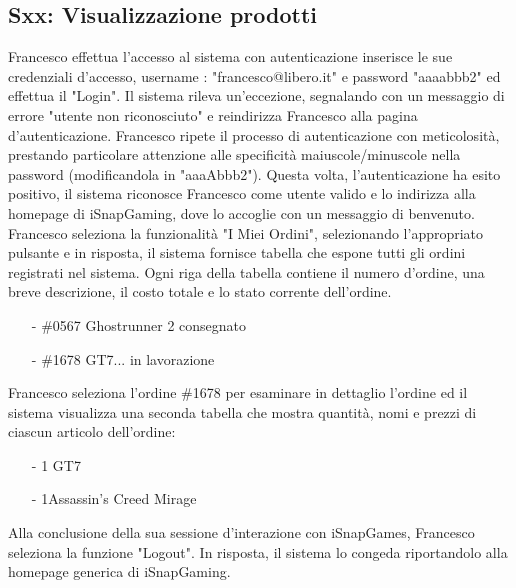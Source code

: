 \documentclass[12pt, a4paper, oneside]{book}
\begin{document}
    \subsection*{Sxx: Visualizzazione prodotti}
        Francesco effettua l'accesso al sistema con autenticazione inserisce  le sue credenziali d'accesso, username :
         "francesco@libero.it" e password "aaaabbb2" ed effettua il "Login". Il sistema rileva un'eccezione, segnalando con un
        messaggio di errore "utente non riconosciuto" e reindirizza Francesco alla pagina d'autenticazione. Francesco ripete
        il processo di autenticazione con meticolosità, prestando particolare attenzione alle specificità maiuscole/minuscole
        nella password (modificandola in "aaaAbbb2"). Questa volta, l'autenticazione ha esito positivo, il sistema riconosce
        Francesco come utente valido e lo indirizza alla homepage di iSnapGaming, dove lo accoglie con un messaggio di benvenuto.
        Francesco seleziona la funzionalità "I Miei Ordini", selezionando l'appropriato pulsante e in risposta, il sistema
        fornisce tabella che espone tutti gli ordini registrati nel sistema. Ogni riga della tabella contiene il numero
        d'ordine, una breve descrizione, il costo totale e lo stato corrente dell'ordine.
        \begin{itemize}
            \item [-] \#0567 Ghostrunner 2 		consegnato
            \item [-] \#1678 GT7... 	in lavorazione
        \end{itemize}
        Francesco seleziona l'ordine \#1678 per esaminare in dettaglio l'ordine ed il  sistema visualizza una seconda tabella
        che mostra quantità, nomi e prezzi di ciascun articolo dell'ordine:
        \begin{itemize}
            \setlength\itemsep{.05cm}
            \item [-] 1	GT7 
            \item [-] 1Assassin's Creed Mirage	
        \end{itemize}
        Alla conclusione della sua sessione d'interazione con iSnapGames, Francesco seleziona la funzione
        "Logout". In risposta, il sistema lo congeda riportandolo alla homepage generica di iSnapGaming.
\end{document}
